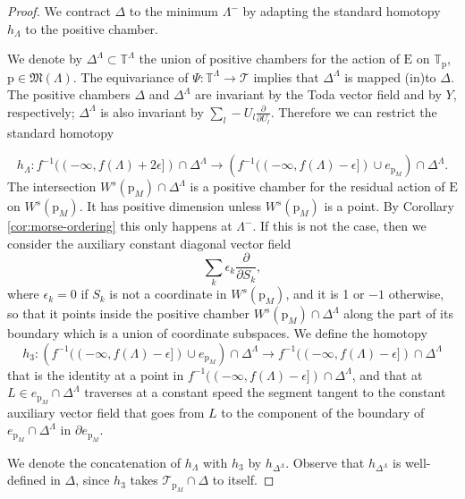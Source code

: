 \documentclass[10pt,a4paper]{amsart}
\newcommand{\E}{\mathrm{E}}
\renewcommand{\H}{\mathrm{H}}
\renewcommand{\L}{\mathrm{L}}
\newcommand{\T}{\mathbb{T}}
\newcommand{\cT}{\mathcal{T}}
\newcommand{\p}{\mathrm{p}}
\begin{document}
\begin{proof}
We contract $\Delta$ to the minimum $\Lambda^-$ by adapting the
standard homotopy $h_\Lambda$ to the positive chamber.

%
We denote by $\Delta^\Lambda\subset \T^\Lambda$ the union of positive chambers for the action of $\E$ on $\T_\p$, $\p\in \mathfrak{M}(\Lambda)$. The equivariance of $\Psi:\T^\Lambda\to \cT$ implies that $\Delta^\Lambda$ is mapped (in)to $\Delta$. The positive chambers $\Delta$ and $\Delta^\Lambda$ are invariant by the Toda vector field and by $Y$, respectively; $\Delta^\Lambda$ is also invariant by $\sum_l -U_l\frac{\partial}{\partial U_l}$. Therefore we can restrict the standard homotopy

\begin{equation}\label{eq:fundamental-standard-homotopy}
  h_\Lambda:f^{-1}((-\infty, f(\Lambda)+2\epsilon])\cap \Delta^\Lambda\to \left(f^{-1}((-\infty, f(\Lambda)-\epsilon])\cup e_{\p_M}\right)\cap \Delta^\Lambda.
\end{equation}
The intersection $W^s(\p_M)\cap \Delta^\Lambda$ is a positive chamber for the residual action of $\mathrm{E}$ on $W^s(\p_M)$. It has positive dimension  unless $W^s(\p_M)$ is a point. By Corollary \ref{cor:morse-ordering} this only happens at $\Lambda^-$. If this is not the case, then we consider the auxiliary constant diagonal vector field
\[\sum_{k}\epsilon_k\frac{\partial}{\partial S_k},\]
where $\epsilon_k=0$ if $S_k$ is not a coordinate in $W^s(\p_M)$, and it is 1 or $-1$ otherwise, so that it points inside the positive chamber $W^s(\p_M)\cap \Delta^\Lambda$ along the part of its boundary which is a union of coordinate subspaces. We define the homotopy
\[h_3:\left(f^{-1}((-\infty, f(\Lambda)-\epsilon])\cup e_{\p_M}\right)\cap \Delta^\Lambda\to f^{-1}((-\infty, f(\Lambda)-\epsilon])\cap \Delta^\Lambda\]
that is the identity  at a point in $f^{-1}((-\infty, f(\Lambda)-\epsilon])\cap \Delta^\Lambda$, and that at  $L\in e_{\p_M}\cap \Delta^\Lambda$ traverses at a constant speed the segment tangent to the constant auxiliary vector field that goes from $L$ to the component of the boundary of  $e_{\p_M}\cap \Delta^\Lambda$ in $\partial e_{\p_M}$.

We denote the concatenation of $h_\Lambda$ with $h_3$ by $h_{\Delta^\Lambda}$. Observe that $h_{\Delta^\Lambda}$ is well-defined in $\Delta$, since $h_3$ takes $\cT_{\p_M}\cap \Delta$ to itself.




\end{proof}
\end{document}
